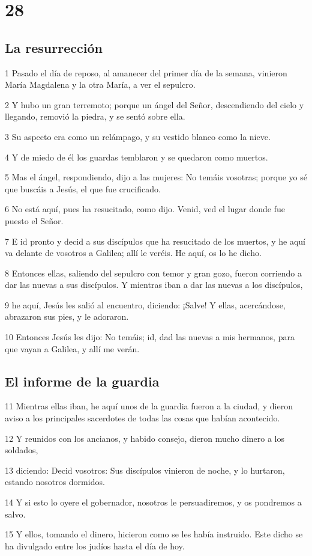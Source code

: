 \chapter{28}

\section*{La resurrección}

\par 1 Pasado el día de reposo, al amanecer del primer día de la semana, vinieron María Magdalena y la otra María, a ver el sepulcro.
\par 2 Y hubo un gran terremoto; porque un ángel del Señor, descendiendo del cielo y llegando, removió la piedra, y se sentó sobre ella.
\par 3 Su aspecto era como un relámpago, y su vestido blanco como la nieve.
\par 4 Y de miedo de él los guardas temblaron y se quedaron como muertos.
\par 5 Mas el ángel, respondiendo, dijo a las mujeres: No temáis vosotras; porque yo sé que buscáis a Jesús, el que fue crucificado.
\par 6 No está aquí, pues ha resucitado, como dijo. Venid, ved el lugar donde fue puesto el Señor.
\par 7 E id pronto y decid a sus discípulos que ha resucitado de los muertos, y he aquí va delante de vosotros a Galilea; allí le veréis. He aquí, os lo he dicho.
\par 8 Entonces ellas, saliendo del sepulcro con temor y gran gozo, fueron corriendo a dar las nuevas a sus discípulos. Y mientras iban a dar las nuevas a los discípulos,
\par 9 he aquí, Jesús les salió al encuentro, diciendo: ¡Salve! Y ellas, acercándose, abrazaron sus pies, y le adoraron.
\par 10 Entonces Jesús les dijo: No temáis; id, dad las nuevas a mis hermanos, para que vayan a Galilea, y allí me verán.

\section*{El informe de la guardia}

\par 11 Mientras ellas iban, he aquí unos de la guardia fueron a la ciudad, y dieron aviso a los principales sacerdotes de todas las cosas que habían acontecido.
\par 12 Y reunidos con los ancianos, y habido consejo, dieron mucho dinero a los soldados,
\par 13 diciendo: Decid vosotros: Sus discípulos vinieron de noche, y lo hurtaron, estando nosotros dormidos.
\par 14 Y si esto lo oyere el gobernador, nosotros le persuadiremos, y os pondremos a salvo.
\par 15 Y ellos, tomando el dinero, hicieron como se les había instruido. Este dicho se ha divulgado entre los judíos hasta el día de hoy.

